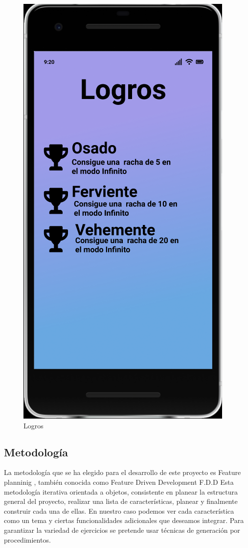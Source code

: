 \documentclass{article}
\begin{document}
\begin{figure}[H]
    \centering
    \includegraphics[scale=0.9]{imgs/Figma/Logros}
    \caption{Logros}
\end{figure}
\subsection{Metodología}
La metodología que se ha elegido para el desarrollo de este proyecto es Feature planninig 
\cite{hunt2006feature}, también conocida como Feature Driven 
Development F.D.D Esta metodología iterativa orientada a objetos, consistente en planear 
la estructura general del proyecto, realizar una lista de características, planear y finalmente 
construir cada una de ellas. En nuestro caso podemos ver cada característica como un tema y ciertas 
funcionalidades adicionales que deseamos integrar. Para garantizar la variedad de ejercicios se 
pretende usar técnicas de generación por procedimientos.
\end{document}
